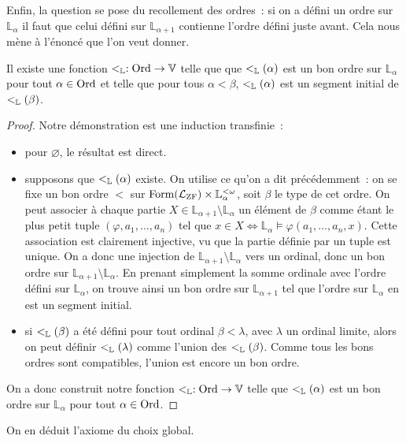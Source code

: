 Enfin, la question se pose du recollement des ordres~: si on a défini un ordre
sur $\mathbb L_\alpha$ il faut que celui défini sur $\mathbb L_{\alpha + 1}$
contienne l'ordre défini juste avant. Cela nous mène à l'énoncé que l'on veut
donner.

\begin{theorem}
  Il existe une fonction $<_{\mathbb L} : \operatorname{Ord} \to \mathbb V$ telle que que
  $<_{\mathbb L}(\alpha)$ est un bon ordre sur $\mathbb L_\alpha$ pour tout
  $\alpha\in \operatorname{Ord}$ et telle que pour tous $\alpha < \beta$,
  $<_{\mathbb L}(\alpha)$ est un segment initial de $<_{\mathbb L}(\beta)$.
\end{theorem}

\begin{proof}
  Notre démonstration est une induction transfinie~:
  \begin{itemize}
  \item pour $\varnothing$, le résultat est direct.
  \item supposons que $<_{\mathbb L}(\alpha)$ existe. On utilise ce qu'on a dit
    précédemment~: on se fixe un bon ordre $<$ sur
    $\operatorname{Form}(\mathcal L_{\operatorname{ZF}})\times \mathbb L_{\alpha}^{<\omega}$, soit
    $\beta$ le type de cet ordre. On peut associer à chaque partie
    $X\in\mathbb L_{\alpha + 1}\setminus\mathbb L_\alpha$ un élément de $\beta$
    comme étant le plus petit tuple $(\varphi,a_1,\ldots,a_n)$ tel que
    $x\in X \iff \mathbb L_{\alpha}\models \varphi(a_1,\ldots,a_n,x)$.
    Cette association est clairement injective, vu que la partie définie par
    un tuple est unique. On a donc une injection de
    $\mathbb L_{\alpha + 1}\setminus \mathbb L_\alpha$ vers un ordinal, donc un
    bon ordre sur $\mathbb L_{\alpha + 1} \setminus \mathbb L_\alpha$.
    En prenant simplement la somme ordinale avec l'ordre défini sur
    $\mathbb L_\alpha$, on trouve ainsi un bon ordre sur
    $\mathbb L_{\alpha + 1}$ tel que l'ordre sur $\mathbb L_\alpha$ en est
    un segment initial.
  \item si $<_{\mathbb L}(\beta)$ a été défini pour tout ordinal $\beta < \lambda$,
    avec $\lambda$ un ordinal limite, alors on peut définir $<_{\mathbb L}(\lambda)$
    comme l'union des $<_{\mathbb L}(\beta)$. Comme tous les bons ordres sont
    compatibles, l'union est encore un bon ordre.
  \end{itemize}
  On a donc construit notre fonction $<_{\mathbb L} : \operatorname{Ord} \to \mathbb V$ telle que
  $<_{\mathbb L}(\alpha)$ est un bon ordre sur $\mathbb L_\alpha$ pour tout
  $\alpha\in\operatorname{Ord}$.
\end{proof}

On en déduit l'axiome du choix global.

